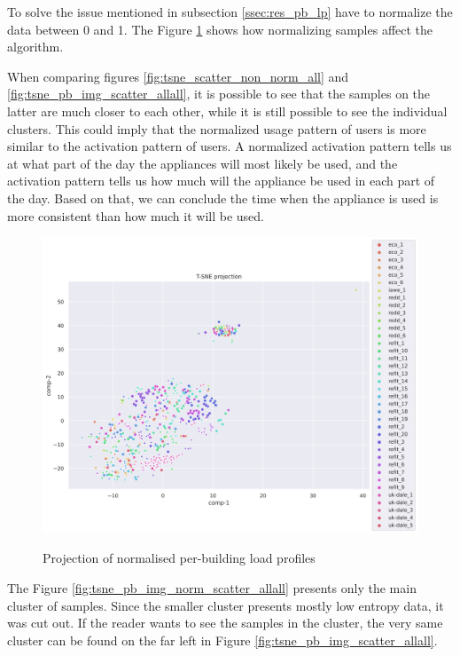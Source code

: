 To solve the issue mentioned in subsection \ref{ssec:res_pb_lp} have to normalize the data between 0 and 1.
The Figure \ref{fig:tsne_pb_scatter_all_all} shows how normalizing samples affect the algorithm.

When comparing figures \ref{fig:tsne_scatter_non_norm_all} and \ref{fig:tsne_pb_img_scatter_allall},
it is possible to see that the samples on the latter are much closer to each other,
while it is still possible to see the individual clusters.
This could imply that the normalized usage pattern of users is more similar to the activation pattern of users.
A normalized activation pattern tells us at what part of the day the appliances will most likely be used,
and the activation pattern tells us how much will the appliance be used in each part of the day.
Based on that, we can conclude the time when the appliance is used is more consistent than how much it will be used. 


\begin{figure}[H]
	\centering
	\caption{Projection of normalised per-building load profiles}
	\includegraphics[width=1.2\textwidth]{Figures/TSNE/TSNE_per_building/all/scatter_all_all.png}
	\label{fig:tsne_pb_scatter_all_all}
\end{figure}

The Figure \ref{fig:tsne_pb_img_norm_scatter_allall} presents only the main cluster of samples.
Since the smaller cluster presents mostly low entropy data, it was cut out. 
If the reader wants to see the samples in the cluster, the very same cluster can be found on the far left in Figure \ref{fig:tsne_pb_img_scatter_allall}.

